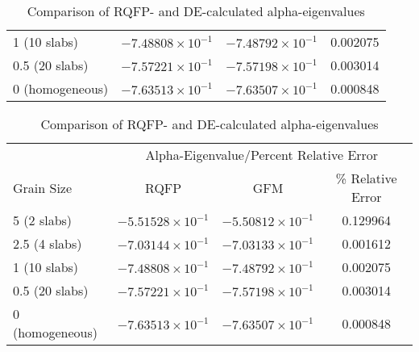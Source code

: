 \begin{table}[!htbp]
\begin{subtable}[!htbp]{1.0\textwidth}
\begin{tabular}{@{}lccc@{}}
	1 (10 slabs) & $-7.48808 \times 10^{-1}$ & $-7.48792 \times 10^{-1}$ & 0.002075 \\ 
	0.5 (20 slabs) & $-7.57221 \times 10^{-1}$ & $-7.57198 \times 10^{-1}$ & 0.003014 \\ 
	0 (homogeneous) & $-7.63513 \times 10^{-1}$ & $-7.63507 \times 10^{-1}$ & 0.000848 \\ 
	\bottomrule
	\end{tabular}
	\caption{Comparison of RQFP- and GFM-calculated alpha-eigenvalues}
	\label{AlphaGFM}
	\end{subtable}%
	\vspace{0.25cm}
	\begin{subtable}[!htbp]{1.0\textwidth}
	\centering{}
	\begin{tabular}{@{}lccc@{}}\toprule
	& \multicolumn{3}{c}{Alpha-Eigenvalue/Percent Relative Error} \\
	\cmidrule{2-4} Grain Size & RQFP & GFM & \% Relative Error \\
	\midrule
	5 (2 slabs) & $-5.51528 \times 10^{-1}$ & $-5.50812 \times 10^{-1}$ & 0.129964 \\ 
	2.5 (4 slabs) & $-7.03144 \times 10^{-1}$ & $-7.03133 \times 10^{-1}$ & 0.001612 \\ 
	1 (10 slabs) & $-7.48808 \times 10^{-1}$ & $-7.48792 \times 10^{-1}$ & 0.002075 \\ 
	0.5 (20 slabs) & $-7.57221 \times 10^{-1}$ & $-7.57198 \times 10^{-1}$ & 0.003014 \\ 
	0 (homogeneous) & $-7.63513 \times 10^{-1}$ & $-7.63507 \times 10^{-1}$ & 0.000848 \\ 
	\bottomrule
	\end{tabular}
	\caption{Comparison of RQFP- and DE-calculated alpha-eigenvalues}
	\label{AlphaDE}
	\end{subtable}
\end{table}


